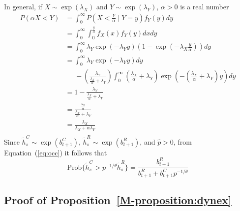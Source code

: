 In general, if $X \sim \exp\left(\lambda_{X}\right)$ and $Y \sim \exp\left(\lambda_{Y}\right)$, $\alpha>0$ is a real number
\begin{equation}\label{eq:occ}
	\begin{aligned}
		P(\alpha X<Y) &=\int_{0}^{\infty} P( X<\frac{Y}{\alpha} \mid Y=y) f_{Y}(y) d y \\
		&=\int_{0}^{\infty} \int_{0}^{\frac{y}{\alpha}} f_{X}(x) f_{Y}(y) d x d y \\
		&=\int_{0}^{\infty} \lambda_{Y} \exp \left(-\lambda_{Y} y\right)\left(1-\exp \left(-\lambda_{X} \frac{y}{\alpha}\right)\right) d y \\
		&=\int_{0}^{\infty} \lambda_{Y} \exp \left(-\lambda_{Y} y\right) d y\\&\;\;\;\;\; -\left(\frac{\lambda_{Y}}{\frac{\lambda_{X}}{\alpha}+\lambda_{Y}}\right) \int_{0}^{\infty}\left(\frac{\lambda_{X}}{\alpha}+\lambda_{Y}\right) \exp \left(-\left(\frac{\lambda_{X}}{\alpha}+\lambda_{Y}\right) y\right) d y \\
		&=1-\frac{\lambda_{Y}}{\frac{\lambda_{X}}{\alpha}+\lambda_{Y}} \\
		&=\frac{\frac{\lambda_{X}}{\alpha}}{\frac{\lambda_{X}}{\alpha}+\lambda_{Y}} \\
		&=\frac{\lambda_{X}}{\lambda_{X}+\alpha\lambda_{Y}} \\
	\end{aligned}
\end{equation}
Since $\tilde{h}^C_s \sim \exp(b^C_{t+1})$, $\tilde{h}^R_s \sim \exp(b^R_{t+1})$, and $\hat{p}>0$, from Equation~(\ref{eq:occ}) it follows that
\begin{equation*}
	\text{Prob}\{\tilde{h}^C_s>p^{-1/\theta}\tilde{h}^R_s\}=\frac{b^R_{t+1}}{b^R_{t+1}+b^C_{t+1} p^{-1/\theta}}
\end{equation*}

\subsection{Proof of Proposition~\ref{M-proposition:dynex}}\label{app:prf1}

